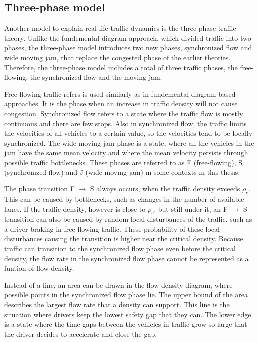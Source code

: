 \documentclass[english, 12pt, a4paper, elec, utf8, pdfa, online]{aaltothesis}
\begin{document}
\subsection{Three-phase model}

Another model to explain real-life traffic dynamics is the three-phase traffic theory. Unlike the fundemental diagram approach, which divided traffic into two phases, the three-phase model introduces two new phases, synchronized flow and wide moving jam, that replace the congested phase of the earlier theories. Therefore, the three-phase model includes a total of three traffic phases, the free-flowing, the synchronized flow and the moving jam.

Free-flowing traffic refers is used similarly as in fundemental diagram based approaches. It is the phase when an increase in traffic density will not cause congestion. Synchronized flow refers to a state where the traffic flow is mostly continuous and there are few stops. Also in synchronized flow, the traffic limits the velocities of all vehicles to a certain value, so the velocities tend to be locally synchronized. The wide moving jam phase is a state, where all the vehicles in the jam have the same mean velocity and where the mean velocity persists through possible traffic bottlenecks. These phases are referred to as F (free-flowing), S (synchronized flow) and J (wide moving jam) in some contexts in this thesis.

The phase transition F $\to$ S always occurs, when the traffic density exceeds $\rho_c$. This can be caused by bottlenecks, such as changes in the number of available lanes. If the traffic density, however is close to $\rho_c$, but still under it, an F $\to$ S transition can also be caused by random local disturbances of the traffic, such as a driver braking in free-flowing traffic. These probability of these local disturbances causing the transition is higher near the critical density. Because traffic can transition to the synchronized flow phase even before the critical density, the flow rate in the synchronized flow phase cannot be represented as a funtion of flow density.

Instead of a line, an area can be drawn in the flow-density diagram, where possible points in the synchronized flow phase lie. The upper bound of the area describes the largest flow rate that a density can support. This line is the situation where drivers keep the lowest safety gap that they can. The lower edge is a state where the time gaps between the vehicles in traffic grow so large that the driver decides to accelerate and close the gap.
\end{document}
